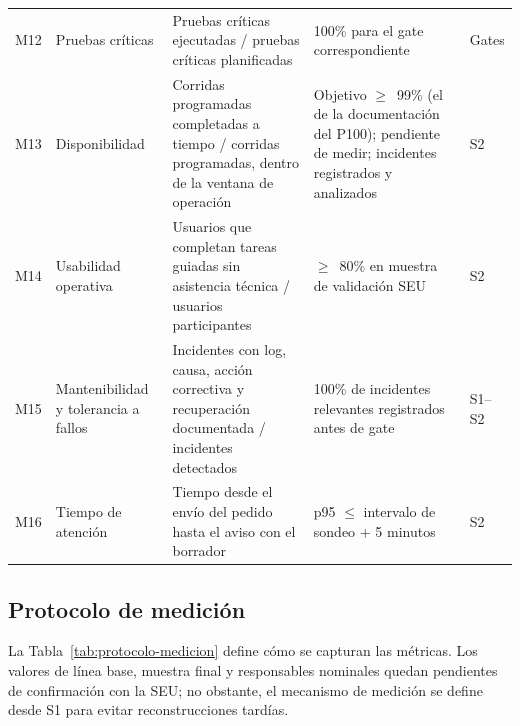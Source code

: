 \documentclass[a4paper, 12pt]{article}
\begin{document}
{\begin{longtable}{L{0.05\textwidth}L{0.16\textwidth}L{0.28\textwidth}L{0.29\textwidth}L{0.07\textwidth}}
    M12 & Pruebas cr\'iticas & Pruebas cr\'iticas ejecutadas / pruebas cr\'iticas planificadas & 100\% para el gate correspondiente & Gates \\
    M13 & Disponibilidad & Corridas programadas completadas a tiempo / corridas programadas, dentro de la ventana de operaci\'on & Objetivo $\geq$~99\% (el de la documentaci\'on del \ac{P100}); pendiente de medir; incidentes registrados y analizados & S2 \\
    M14 & Usabilidad operativa & Usuarios que completan tareas guiadas sin asistencia t\'ecnica / usuarios participantes & $\geq$~80\% en muestra de validaci\'on \ac{SEU} & S2 \\
    M15 & Mantenibilidad y tolerancia a fallos & Incidentes con log, causa, acci\'on correctiva y recuperaci\'on documentada / incidentes detectados & 100\% de incidentes relevantes registrados antes de gate & S1--S2 \\
    M16 & Tiempo de atenci\'on & Tiempo desde el env\'io del pedido hasta el aviso con el borrador & p95 $\leq$ intervalo de sondeo + 5 minutos & S2 \\
    \bottomrule
\end{longtable}
}

\subsection{Protocolo de medici\'on}

La Tabla~\ref{tab:protocolo-medicion} define c\'omo se capturan las m\'etricas. Los valores de l\'inea base, muestra final y responsables nominales quedan pendientes de confirmaci\'on con la \ac{SEU}; no obstante, el mecanismo de medici\'on se define desde S1 para evitar reconstrucciones tard\'ias.
\end{document}

